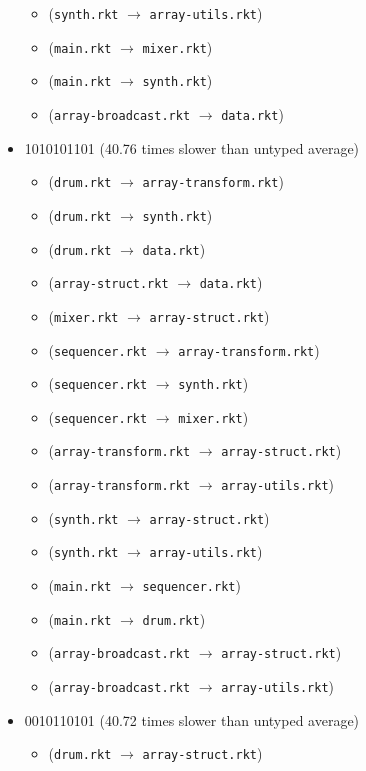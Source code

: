 \documentclass{article}
\newcommand{\mono}[1]{\texttt{#1}}
\begin{document}
\begin{itemize}
\begin{itemize}
  \item (\mono{synth.rkt} $\rightarrow$ \mono{array-utils.rkt})
  \item (\mono{main.rkt} $\rightarrow$ \mono{mixer.rkt})
  \item (\mono{main.rkt} $\rightarrow$ \mono{synth.rkt})
  \item (\mono{array-broadcast.rkt} $\rightarrow$ \mono{data.rkt})
  \end{itemize}
\item 1010101101 (40.76 times slower than untyped average)
  \begin{itemize}
  \item (\mono{drum.rkt} $\rightarrow$ \mono{array-transform.rkt})
  \item (\mono{drum.rkt} $\rightarrow$ \mono{synth.rkt})
  \item (\mono{drum.rkt} $\rightarrow$ \mono{data.rkt})
  \item (\mono{array-struct.rkt} $\rightarrow$ \mono{data.rkt})
  \item (\mono{mixer.rkt} $\rightarrow$ \mono{array-struct.rkt})
  \item (\mono{sequencer.rkt} $\rightarrow$ \mono{array-transform.rkt})
  \item (\mono{sequencer.rkt} $\rightarrow$ \mono{synth.rkt})
  \item (\mono{sequencer.rkt} $\rightarrow$ \mono{mixer.rkt})
  \item (\mono{array-transform.rkt} $\rightarrow$ \mono{array-struct.rkt})
  \item (\mono{array-transform.rkt} $\rightarrow$ \mono{array-utils.rkt})
  \item (\mono{synth.rkt} $\rightarrow$ \mono{array-struct.rkt})
  \item (\mono{synth.rkt} $\rightarrow$ \mono{array-utils.rkt})
  \item (\mono{main.rkt} $\rightarrow$ \mono{sequencer.rkt})
  \item (\mono{main.rkt} $\rightarrow$ \mono{drum.rkt})
  \item (\mono{array-broadcast.rkt} $\rightarrow$ \mono{array-struct.rkt})
  \item (\mono{array-broadcast.rkt} $\rightarrow$ \mono{array-utils.rkt})
  \end{itemize}
\item 0010110101 (40.72 times slower than untyped average)
  \begin{itemize}
  \item (\mono{drum.rkt} $\rightarrow$ \mono{array-struct.rkt})

\end{itemize}
\end{itemize}
\end{document}

